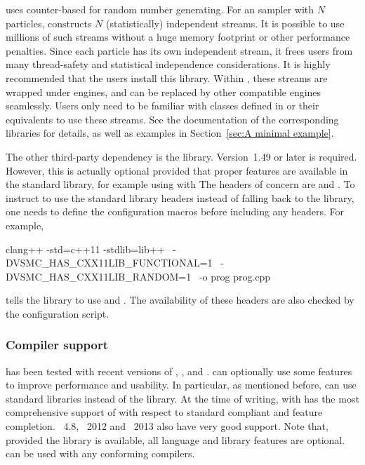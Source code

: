 \vsmc uses \random \cite{Salmon:2011um} counter-based \rng for random number
generating. For an \smc sampler with $N$ particles, \vsmc constructs $N$
(statistically) independent \rng streams. It is possible to use millions of
such streams without a huge memory footprint or other performance penalties.
Since each particle has its own independent \rng stream, it frees users from
many thread-safety and statistical independence considerations. It is highly
recommended that the users install this library. Within \vsmc, these \rng
streams are wrapped under \cppoo{} \rng engines, and can be replaced by other
compatible \rng engines seamlessly. Users only need to be familiar with
classes defined in \cppoo{}  or their \boost equivalents
to use these \rng streams. See the documentation of the corresponding
libraries for details, as well as examples in Section~\ref{sec:A minimal
  example}.

The other third-party dependency is the \boost library. Version~1.49 or later
is required. However, this is actually optional provided that proper \cppoo
features are available in the standard library, for example using \clang with
\libcpp \cite{libcpp} The \cppoo headers of concern are
 and . To instruct \vsmc to use
the standard library headers instead of falling back to the \boost library,
one needs to define the configuration macros before including any \vsmc
headers. For example,
\begin{shcode}
clang++ -std=c++11 -stdlib=lib++     \
    -DVSMC_HAS_CXX11LIB_FUNCTIONAL=1  \
    -DVSMC_HAS_CXX11LIB_RANDOM=1      \
    -o prog prog.cpp
\end{shcode}
tells the library to use \cppoo{}  and
\cppinline{<random>}. The availability of these headers are also checked by
the \cmake configuration script.

\subsubsection{Compiler support}
\label{ssub:Compiler support}

\vsmc has been tested with recent versions of \clang, \gcc \cite{gcc}, \icpc
\cite{icpc} and \msvc \cite{msvc}. \vsmc can optionally use some \cppoo
features to improve performance and usability. In particular, as mentioned
before, \vsmc can use \cppoo standard libraries instead of the \boost library.
At the time of writing, \clang with \libcpp has the most comprehensive support
of \cppoo with respect to standard compliant and feature completion. \gcc~4.8,
\msvc~2012 and \icpc~2013 also have very good \cppoo support. Note that,
provided the \boost library is available, all \cppoo language and library
features are optional. \vsmc can be used with any \cppne conforming compilers.

